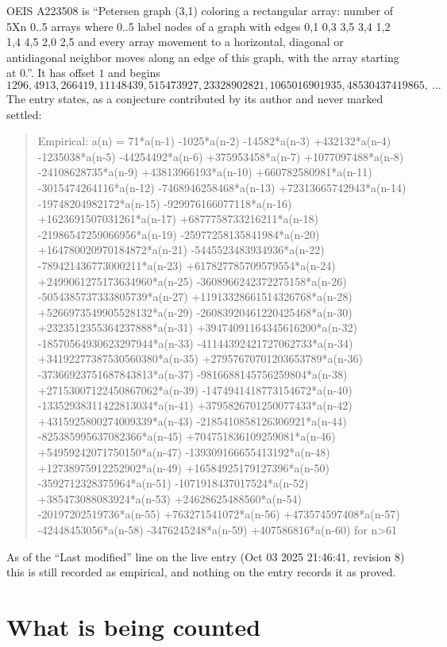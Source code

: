 \documentclass[11pt,a4paper]{article}
\theoremstyle{plain}
\theoremstyle{definition}
\begin{document}
OEIS A223508 is ``Petersen graph (3,1) coloring a rectangular array: number of 5Xn 0..5 arrays where 0..5 label nodes of a graph with edges 0,1 0,3 3,5 3,4 1,2 1,4 4,5 2,0 2,5 and every array movement to a horizontal, diagonal or antidiagonal neighbor moves along an edge of this graph, with the array starting at 0.''. It has offset $1$ and begins
\[
1296, 4913, 266419, 11148439, 515473927, 23328902821, 1065016901935, 48530437419865,\ \dots
\]
The entry states, as a conjecture contributed by its author and never marked settled:
\begin{quote}
Empirical: a(n) = 71*a(n-1) -1025*a(n-2) -14582*a(n-3) +432132*a(n-4) -1235038*a(n-5) -44254492*a(n-6) +375953458*a(n-7) +1077097488*a(n-8) -24108628735*a(n-9) +43813966193*a(n-10) +660782580981*a(n-11) -3015474264116*a(n-12) -7468946258468*a(n-13) +72313665742943*a(n-14) -19748204982172*a(n-15) -929976166077118*a(n-16) +1623691507031261*a(n-17) +6877758733216211*a(n-18) -21986547259066956*a(n-19) -25977258135841984*a(n-20) +164780020970184872*a(n-21) -5445523483934936*a(n-22) -789421436773000211*a(n-23) +617827785709579554*a(n-24) +2499061275173634960*a(n-25) -3608966242372275158*a(n-26) -5054385737333805739*a(n-27) +11913328661514326768*a(n-28) +5266973549905528132*a(n-29) -26083920461220425468*a(n-30) +2323512355364237888*a(n-31) +39474091164345616200*a(n-32) -18570564930623297944*a(n-33) -41144392421727062733*a(n-34) +34192277387530560380*a(n-35) +27957670701203653789*a(n-36) -37366923751687843813*a(n-37) -9816688145756259804*a(n-38) +27153007122450867062*a(n-39) -1474941418773154672*a(n-40) -13352938311422813034*a(n-41) +3795826701250077433*a(n-42) +4315925800274009339*a(n-43) -2185410858126306921*a(n-44) -825385995637082366*a(n-45) +704751836109259081*a(n-46) +54959242071750150*a(n-47) -139309166655413192*a(n-48) +12738975912252902*a(n-49) +16584925179127396*a(n-50) -3592712328375964*a(n-51) -1071918437017524*a(n-52) +385473088083924*a(n-53) +24628625488560*a(n-54) -20197202519736*a(n-55) +763271541072*a(n-56) +473574597408*a(n-57) -42448453056*a(n-58) -3476245248*a(n-59) +407586816*a(n-60) for n>61
\end{quote}
As of the ``Last modified'' line on the live entry (Oct 03 2025 21:46:41, revision 8) this is still
recorded as empirical, and nothing on the entry records it as proved.

\section{What is being counted}
\end{document}
